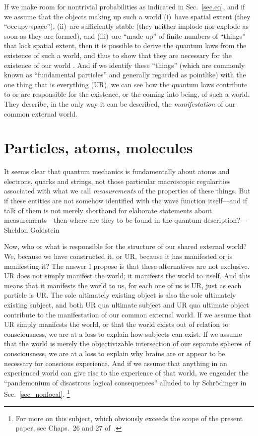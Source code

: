 \documentclass[12pt]{article}
\begin{document}
If we make room for nontrivial probabilities as indicated in Sec.~\ref{sec.cq}, and if we assume that the objects making up such a world (i)~have spatial extent (they ``occupy space''), (ii)~are sufficiently stable (they neither implode nor explode as soon as they are formed), and (iii)~are ``made up'' of finite numbers of ``things'' that lack spatial extent, then it is possible to derive the quantum laws from the existence of such a world, and thus to show that they are necessary for the existence of our world \cite{Mohrhoff-QMexplained,Mohrhoff-justso}. And if we identify these ``things'' (which are commonly known as ``fundamental particles'' and generally regarded as pointlike) with the one thing that is everything (UR), we can see how the quantum laws contribute to or are responsible for the existence, or the coming into being, of such a world. They describe, in the only way it can be described, the \emph{manifestation} of our common external world.


\section{Particles, atoms, molecules}\label{sec.pa}
{\leftskip\parindent\small It seems clear that quantum mechanics is fundamentally about atoms and electrons, quarks and strings, not those particular macroscopic regularities associated with what we call \emph{measurements} of the properties of these things. But if these entities are not somehow identified with the wave function itself---and if talk of them is not merely shorthand for elaborate statements about measurements---then where are they to be found in the quantum description?---Sheldon Goldstein \cite{Goldstein2017}\par}\medskip

\noindent Now, who or what is responsible for the structure of our shared external world? We, because we have constructed it, or UR, because it has manifested or is manifesting it? The answer I propose is that these alternatives are not exclusive. UR does not simply manifest the world; it manifests the world to itself. And this means that it manifests the world to us, for each one of us is UR, just as each particle is UR. The sole ultimately existing object is also the sole ultimately existing subject, and both UR qua ultimate subject and UR qua ultimate object contribute to the manifestation of our common external world. If we assume that UR simply manifests the world, or that the world exists out of relation to consciousness, we are at a loss to explain how subjects can exist. If we assume that the world is merely the objectivizable intersection of our separate spheres of consciousness, we are at a loss to explain why brains are or appear to be necessary for conscious experience. And if we assume that anything in an experienced world can give rise to the experience of that world, we engender the ``pandemonium of disastrous logical consequences'' alluded to by Schr\"odinger in Sec.~\ref{sec_nonlocal}.%
\footnote{For more on this subject, which obviously exceeds the scope of the present paper, see Chaps.~26 and 27 of~\cite{TWATQM}.}
\end{document}
